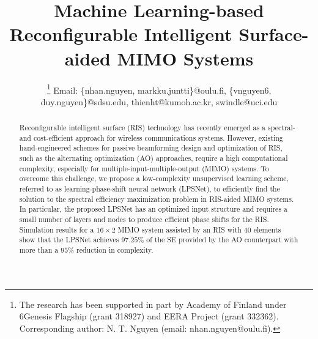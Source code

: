 \documentclass[conference]{IEEEtran}
\begin{document}
	
	\title{Machine Learning-based Reconfigurable Intelligent Surface-aided MIMO Systems}
	
	\author{
		\thanks{The research has been supported in part by Academy of Finland under 6Genesis Flagship (grant 318927) and EERA Project (grant 332362). 
			Corresponding author: N. T. Nguyen (email: nhan.nguyen@oulu.fi).}
		Email: \{nhan.nguyen, markku.juntti\}@oulu.fi, \{vnguyen6,  duy.nguyen\}@sdsu.edu, thienht@kumoh.ac.kr, swindle@uci.edu}
	
	
	
	\maketitle
	
	
	\begin{abstract}
		Reconfigurable intelligent surface (RIS) technology has recently emerged as a spectral- and cost-efficient approach for wireless communications systems. However, existing hand-engineered schemes for passive beamforming design and optimization of RIS, such as the alternating optimization (AO) approaches, require a high computational complexity, especially for multiple-input-multiple-output (MIMO) systems. To overcome this challenge, we propose a low-complexity unsupervised learning scheme, referred to as learning-phase-shift neural network (LPSNet), to efficiently find the solution to the spectral efficiency maximization problem in RIS-aided MIMO systems. In particular, the proposed LPSNet has an optimized input structure and requires a small number of layers and nodes to produce efficient phase shifts for the RIS. Simulation results for a $16 \times 2$ MIMO system assisted by an RIS with $40$ elements show that the LPSNet achieves $97.25\%$ of the SE provided by the AO counterpart with more than a $95\%$ reduction in complexity.
	\end{abstract}
	
\end{document}
